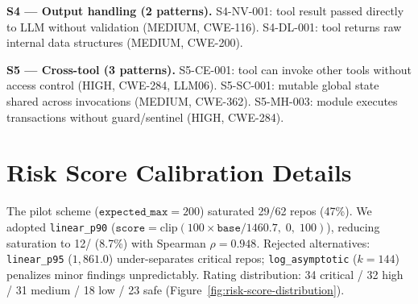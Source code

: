 \documentclass[conference]{IEEEtran}
\begin{document}
\textbf{S4 --- Output handling (2 patterns).}
S4-NV-001: tool result passed directly to LLM without validation
(MEDIUM, CWE-116).
S4-DL-001: tool returns raw internal data structures (MEDIUM,
CWE-200).

\textbf{S5 --- Cross-tool (3 patterns).}
S5-CE-001: tool can invoke other tools without access control (HIGH,
CWE-284, LLM06).
S5-SC-001: mutable global state shared across invocations (MEDIUM,
CWE-362).
S5-MH-003: module executes transactions without guard/sentinel (HIGH,
CWE-284).


\section{Risk Score Calibration Details}

The pilot scheme ($\texttt{expected\_max} = 200$) saturated 29/62 repos (47\%).  We adopted \texttt{linear\_p90} ($\texttt{score} = \mathrm{clip}(100 \times \texttt{base} / 1460.7,\; 0,\; 100)$), reducing saturation to 12/\scanTotalRepos{} (8.7\%) with Spearman $\rho = 0.948$.  Rejected alternatives: \texttt{linear\_p95} ($1{,}861.0$) under-separates critical repos; \texttt{log\_asymptotic} ($k{=}144$) penalizes minor findings unpredictably.  Rating distribution: 34 critical / 32 high / 31 medium / 18 low / 23 safe (Figure~\ref{fig:risk-score-distribution}).




\end{document}
